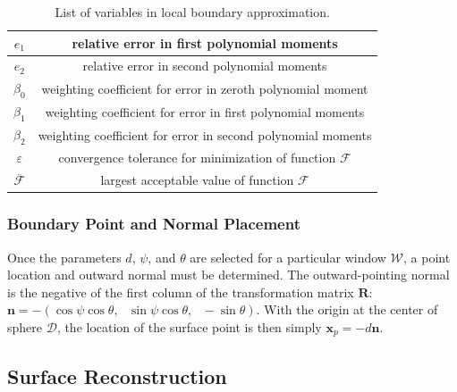 \begin{table}[t!]
\begin{tabular}{|c||c|}
   $e_1$ & relative error in first polynomial moments \\ \hline
   $e_2$ & relative error in second polynomial moments \\ \hline   
   $\beta_0$ & weighting coefficient for error in zeroth polynomial moment \\ \hline
   $\beta_1$ & weighting coefficient for error in first polynomial moments \\ \hline
   $\beta_2$ & weighting coefficient for error in second polynomial moments \\ \hline 
   $\varepsilon$ & convergence tolerance for minimization of function $\mathcal{F}$ \\ \hline
   $\overline{\mathcal{F}}$ \rule{0mm}{4mm} & largest acceptable value of function $\mathcal{F}$ \\ \hline        
\end{tabular}
\caption{List of variables in local boundary approximation.}
\label{tab:surface}
\end{table}

\subsubsection{Boundary Point and Normal Placement}

Once the parameters $d$, $\psi$, and $\theta$ are selected for a particular window $\mathcal{W}$, a point location and outward normal must be determined. The outward-pointing normal is the negative of the first column of the transformation matrix $\bm{R}$: $\bm{n} = -(\cos\psi\cos\theta,\text{\ }\sin\psi\cos\theta,\text{\ }-\sin\theta)$. With the origin at the center of sphere $\mathcal{D}$, the location of the surface point is then simply $\mathbf{x}_p = -d\bm{n}$.

\subsection{Surface Reconstruction}
\label{Surface Reconstruction}

